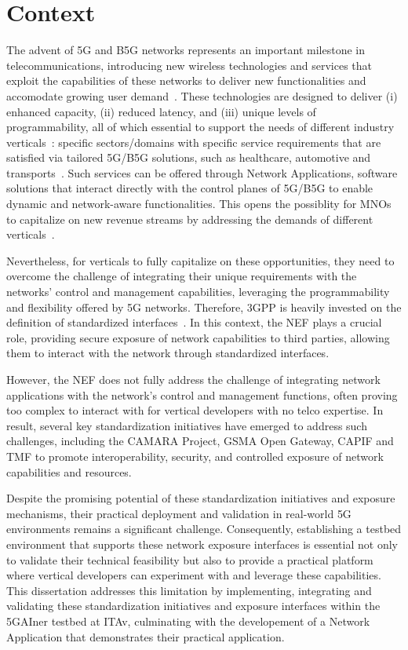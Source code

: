 \section{Context}
\label{chap:introduction:context}

The advent of \acs{5G} and \ac{B5G} networks represents an important milestone in telecommunications, introducing new wireless technologies and services that exploit the capabilities of these networks to deliver new functionalities and accomodate growing user demand~\cite{electronics12102200}. These technologies are designed to deliver (i) enhanced capacity, (ii) reduced latency, and (iii) unique levels of programmability, all of which essential to support the needs of different industry verticals~\cite{SensorsPaper}: specific sectors/domains with specific service requirements that are satisfied via tailored \acs{5G}/\acs{B5G} solutions, such as healthcare, automotive and transports~\cite{disruptive5G}. Such services can be offered through Network Applications, software solutions that interact directly with the control planes of \acs{5G}/\acs{B5G} to enable dynamic and network-aware functionalities. This opens the possiblity for \acfp{MNO} to capitalize on new revenue streams by addressing the demands of different verticals~\cite{SEAL5GVerticals}.

Nevertheless, for verticals to fully capitalize on these opportunities, they need to overcome the challenge of integrating their unique requirements with the networks' control and management capabilities, leveraging the programmability and flexibility offered by \acs{5G} networks. Therefore, \acs{3GPP} is heavily invested on the definition of standardized interfaces~\cite{INTR_ETSI_TS_126_531_V18_2_0}. In this context, the \acf{NEF} plays a crucial role, providing secure exposure of network capabilities to third parties, allowing them to interact with the network through standardized interfaces.

However, the \acs{NEF} does not fully address the challenge of integrating network applications with the network's control and management functions, often proving too complex to interact with for vertical developers with no telco expertise. In result, several key standardization initiatives have emerged to address such challenges, including the CAMARA Project, \acs{GSMA} Open Gateway, \acs{CAPIF} and \acs{TMF} to promote interoperability, security, and controlled exposure of network capabilities and resources.

Despite the promising potential of these standardization initiatives and exposure mechanisms, their practical deployment and validation in real-world \acs{5G} environments remains a significant challenge. Consequently, establishing a testbed environment that supports these network exposure interfaces is essential not only to validate their technical feasibility but also to provide a practical platform where vertical developers can experiment with and leverage these capabilities. This dissertation addresses this limitation by implementing, integrating and validating these standardization initiatives and exposure interfaces within the 5GAIner testbed at \acf{ITAv}, culminating with the developement of a Network Application that demonstrates their practical application.

